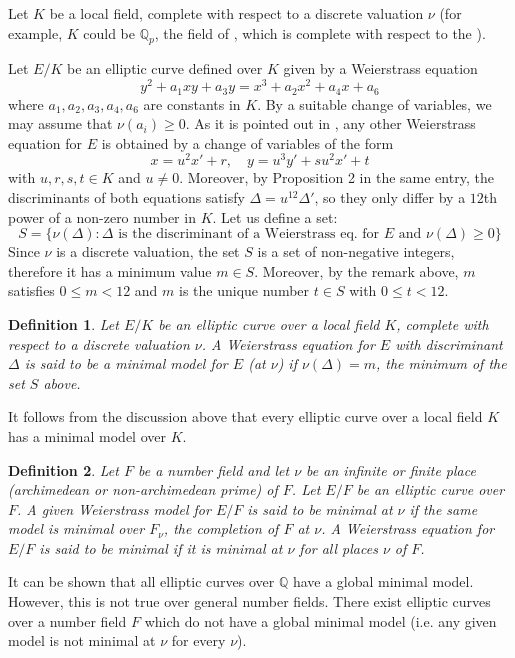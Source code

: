 \documentclass[12pt]{article}
\newtheorem*{defn}{Definition}
\theoremstyle{definition}
\newcommand{\Rats}{\mathbb{Q}}
\begin{document}
Let $K$ be a local field, complete with respect to a discrete valuation $\nu$ (for example, $K$ could be $\Rats_p$, the field of , which is complete with respect to the ).

Let $E/K$ be an elliptic curve defined over $K$ given by a Weierstrass equation 
$$y^2+a_1xy+a_3y=x^3+a_2x^2+a_4x+a_6$$
where $a_1, a_2, a_3,a_4,a_6$ are constants in $K$. By a suitable change of variables, we may assume that $\nu(a_i)\geq 0$. As it is pointed out in , any other Weierstrass equation for $E$ is obtained by a change of variables of the form $$x=u^2x'+r,\quad y=u^3y'+su^2x'+t$$ 
with $u,r,s,t\in K$ and $u\neq 0$. Moreover, by Proposition 2 in the same entry, the discriminants of both equations satisfy $\Delta=u^{12}\Delta'$, so they only differ by a $12$th power of a non-zero number in $K$. Let us define a set:
$$S=\{ \nu(\Delta) : \Delta \text{ is the discriminant of a Weierstrass eq. for $E$ and } \nu(\Delta)\geq 0\}$$
Since $\nu$ is a discrete valuation, the set $S$ is a set of non-negative integers, therefore it has a minimum value $m\in S$. Moreover, by the remark above, $m$ satisfies $0\leq m <12$ and $m$ is the unique number $t\in S$ with $0\leq t < 12$.

\begin{defn}
Let $E/K$ be an elliptic curve over a local field $K$, complete with respect to a discrete valuation $\nu$. A Weierstrass equation for $E$ with discriminant $\Delta$ is said to be a minimal model for $E$ (at $\nu$) if $\nu(\Delta)=m$, the minimum of the set $S$ above.
\end{defn}

It follows from the discussion above that every elliptic curve over a local field $K$ has a minimal model over $K$. 

\begin{defn}
Let $F$ be a number field and let $\nu$ be an infinite or finite place (archimedean or non-archimedean prime) of $F$. Let $E/F$ be an elliptic curve over $F$. A given Weierstrass model for $E/F$ is said to be minimal at $\nu$ if the same model is minimal over $F_\nu$, the completion of $F$ at $\nu$. A Weierstrass equation for $E/F$ is said to be minimal if it is minimal at $\nu$ for all places $\nu$ of $F$.
\end{defn}

It can be shown that all elliptic curves over $\Rats$ have a global minimal model. However, this is not true over general number fields. There exist elliptic curves over a number field $F$ which do not have a global minimal model  (i.e. any given model is not minimal at $\nu$ for every $\nu$).
\end{document}
